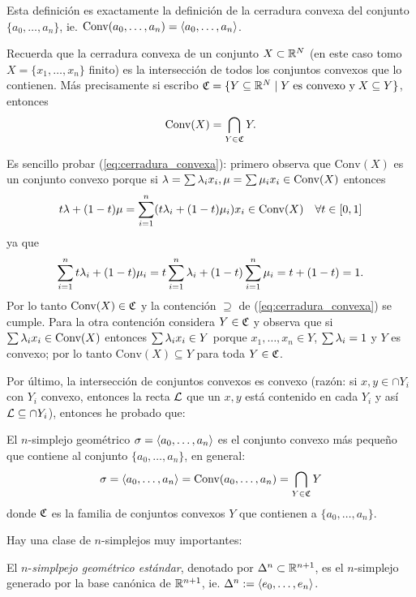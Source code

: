\documentclass[../../topologia_algebraica]{subfiles}
\begin{document}
\begin{nota}
  Esta definici\'on es exactamente la definici\'on de la cerradura convexa del conjunto
  $\{a_0,\ldots,a_n\}$, ie. $\text{Conv}(a_0,\ldots,a_n)=\langle a_0,\ldots,a_n \rangle$.
\end{nota}

Recuerda que la cerradura convexa de un conjunto $X\subset\mathbb{R}^N$ (en este caso tomo
$X=\{x_1,\ldots,x_n\}$ finito) es la intersecci\'on de todos los conjuntos convexos que
lo contienen. M\'as precisamente si escribo
$\mathfrak{C}=\{Y\subseteq\mathbb{R}^N\mid Y\;\text{es convexo y}\; X\subseteq Y\}$, entonces
\begin{equation}
  \label{eq:cerradura_convexa}
  \text{Conv}(X)=\bigcap_{Y\in\mathfrak{C}}Y.
\end{equation}

Es sencillo probar (\ref{eq:cerradura_convexa}): primero observa que $\text{Conv}(X)$ es un
conjunto convexo porque si $\lambda=\sum\lambda_ix_i,\mu=\sum\mu_ix_i\in\text{Conv}(X)$ entonces
\[
  t\lambda+(1-t)\mu=\sum_{i=1}^n(t\lambda_i+(1-t)\mu_i)x_i\in\text{Conv}(X) \quad\forall t\in[0,1]
\]
ya que
\[
  \sum_{i=1}^nt\lambda_i+(1-t)\mu_i=t\sum_{i=1}^n\lambda_i+(1-t)\sum_{i=1}^n\mu_i=t+(1-t)=1.
\]
Por lo tanto $\text{Conv}(X)\in\mathfrak{C}$ y la contenci\'on $\supseteq$ de (\ref{eq:cerradura_convexa})
se cumple.
Para la otra contenci\'on considera $Y\in\mathfrak{C}$ y observa que si $\sum\lambda_ix_i\in\text{Conv}(X)$
entonces $\sum\lambda_ix_i\in Y$ porque $x_1,\ldots,x_n\in Y$, $\sum\lambda_i=1$ y $Y$ es convexo; por lo
tanto $\text{Conv}(X)\subseteq Y$ para toda $Y\in\mathfrak{C}$.

Por \'ultimo, la intersecci\'on de conjuntos convexos es convexo (raz\'on: si $x,y\in\cap Y_i$ con
$Y_i$ convexo, entonces la recta $\mathcal{L}$ que un $x,y$ est\'a contenido en cada $Y_i$ y as\'i
$\mathcal{L}\subseteq \cap Y_i$), entonces he probado que:

\begin{prop}\label{prop:nsimplejo_geometrico_convexo}
  El $n$-simplejo geom\'etrico $\sigma=\langle a_0,\ldots,a_n \rangle$ es el conjunto convexo m\'as peque\~no
  que contiene al conjunto $\{a_0,\ldots,a_n\}$, en general:
  \[
    \sigma=\langle a_0,\ldots,a_n \rangle=\text{Conv}(a_0,\ldots,a_n)=\bigcap_{Y\in\mathfrak{C}}Y
  \]
  donde $\mathfrak{C}$ es la familia de conjuntos convexos $Y$ que contienen a $\{a_0,\ldots,a_n\}$.
\end{prop}

Hay una clase de $n$-simplejos muy importantes:

\begin{defin}
  El $n$-\emph{simplpejo geom\'etrico est\'andar}, denotado por $\Delta^n\subset\mathbb{R}^{n+1}$, es el
  $n$-simplejo generado por la base can\'onica de $\mathbb{R}^{n+1}$, ie. $\Delta^n:=\langle e_0,\ldots,e_n \rangle$.
\end{defin}
\end{document}
